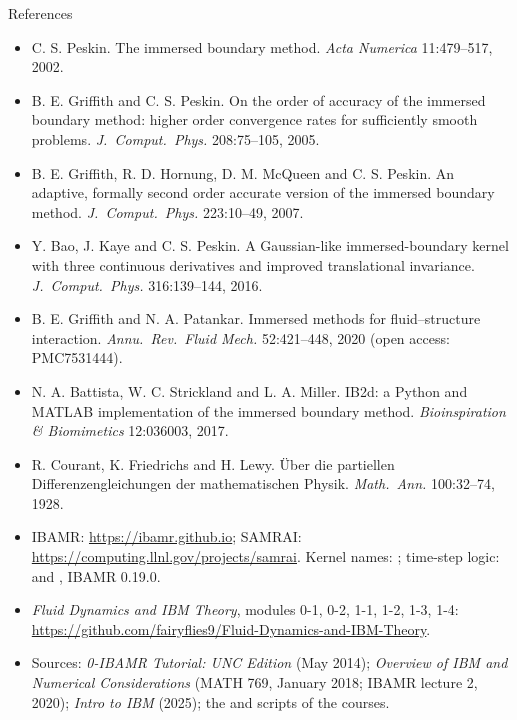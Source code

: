 \documentclass[aspectratio=169,11pt]{beamer}
\begin{document}
\begin{frame}{References}
\scriptsize
\begin{itemize}
  \item C. S. Peskin. The immersed boundary method. \emph{Acta Numerica} 11:479--517, 2002.
  \item B. E. Griffith and C. S. Peskin. On the order of accuracy of the immersed boundary method: higher order convergence rates for sufficiently smooth problems. \emph{J.\ Comput.\ Phys.} 208:75--105, 2005.
  \item B. E. Griffith, R. D. Hornung, D. M. McQueen and C. S. Peskin. An adaptive, formally second order accurate version of the immersed boundary method. \emph{J.\ Comput.\ Phys.} 223:10--49, 2007.
  \item Y. Bao, J. Kaye and C. S. Peskin. A Gaussian-like immersed-boundary kernel with three continuous derivatives and improved translational invariance. \emph{J.\ Comput.\ Phys.} 316:139--144, 2016.
  \item B. E. Griffith and N. A. Patankar. Immersed methods for fluid--structure interaction. \emph{Annu.\ Rev.\ Fluid Mech.} 52:421--448, 2020 (open access: PMC7531444).
  \item N. A. Battista, W. C. Strickland and L. A. Miller. IB2d: a Python and MATLAB implementation of the immersed boundary method. \emph{Bioinspiration \& Biomimetics} 12:036003, 2017.
  \item R. Courant, K. Friedrichs and H. Lewy. \"Uber die partiellen Differenzengleichungen der mathematischen Physik. \emph{Math.\ Ann.} 100:32--74, 1928.
  \item IBAMR: \url{https://ibamr.github.io}; SAMRAI: \url{https://computing.llnl.gov/projects/samrai}. Kernel names: ; time-step logic:  and , IBAMR 0.19.0.
  \item \emph{Fluid Dynamics and IBM Theory}, modules 0-1, 0-2, 1-1, 1-2, 1-3, 1-4: \url{https://github.com/fairyflies9/Fluid-Dynamics-and-IBM-Theory}.
  \item Sources: \emph{0-IBAMR Tutorial: UNC Edition} (May 2014); \emph{Overview of IBM and Numerical Considerations} (MATH 769, January 2018; IBAMR lecture 2, 2020); \emph{Intro to IBM} (2025); the  and  scripts of the courses.
\end{itemize}
\end{frame}
\end{document}

